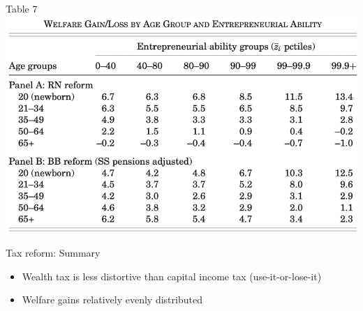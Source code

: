 \documentclass[aspectratio=169,mathserif]{beamer}
\begin{document}
\begin{frame}{Table 7}
    \centering
    \includegraphics[scale = 0.4]{GKKOC_Tab7.png}
\end{frame}

\begin{frame}{Tax reform: Summary}
    \begin{itemize}
        \item Wealth tax is less distortive than capital income tax (use-it-or-lose-it)
        \item Welfare gains relatively evenly distributed%
    \end{itemize}
\end{frame}




\end{document}
